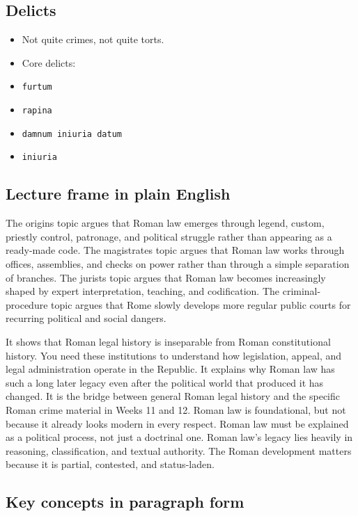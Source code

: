 \documentclass[11pt]{article}
\begin{document}
\subsection{Delicts}

\begin{itemize}
\item Not quite crimes, not quite torts.
\item Core delicts:
\item \texttt{furtum}
\item \texttt{rapina}
\item \texttt{damnum iniuria datum}
\item \texttt{iniuria}
\end{itemize}

\subsection{Lecture frame in plain English}

The origins topic argues that Roman law emerges through legend, custom, priestly control, patronage, and political struggle rather than appearing as a ready-made code. The magistrates topic argues that Roman law works through offices, assemblies, and checks on power rather than through a simple separation of branches. The jurists topic argues that Roman law becomes increasingly shaped by expert interpretation, teaching, and codification. The criminal-procedure topic argues that Rome slowly develops more regular public courts for recurring political and social dangers.

It shows that Roman legal history is inseparable from Roman constitutional history. You need these institutions to understand how legislation, appeal, and legal administration operate in the Republic. It explains why Roman law has such a long later legacy even after the political world that produced it has changed. It is the bridge between general Roman legal history and the specific Roman crime material in Weeks 11 and 12. Roman law is foundational, but not because it already looks modern in every respect. Roman law must be explained as a political process, not just a doctrinal one. Roman law's legacy lies heavily in reasoning, classification, and textual authority. The Roman development matters because it is partial, contested, and status-laden.

\subsection{Key concepts in paragraph form}
\end{document}
